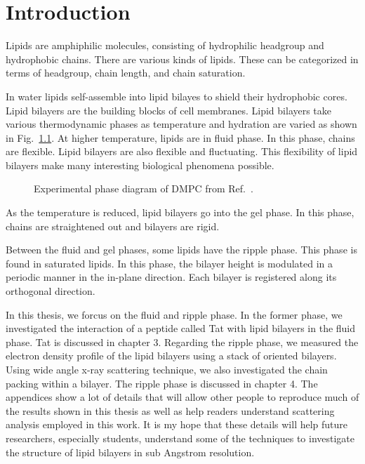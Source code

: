 \chapter{Introduction}
Lipids are amphiphilic molecules, consisting of hydrophilic headgroup
and hydrophobic chains. There are various kinds of lipids. These can be 
categorized in terms of headgroup, chain length, and chain saturation.

In water lipids self-assemble into lipid bilayes to shield their hydrophobic 
cores. Lipid bilayers are the building blocks of cell membranes. Lipid bilayers 
take various thermodynamic phases
as temperature and hydration are varied as shown in Fig.~\ref{fig:phase_diagram}.
At higher temperature, lipids are in fluid phase. In this phase, chains
are flexible. Lipid bilayers are also flexible and fluctuating. This
flexibility of lipid bilayers make many interesting biological
phenomena possible. 

\begin{figure}
  \centering
  \caption{Experimental phase diagram of DMPC from Ref.~\cite{ref:Janiak76}.}
  \label{fig:phase_diagram}
\end{figure}

As the temperature is reduced, lipid bilayers go into the gel phase.
In this phase, chains are straightened out and bilayers are rigid.

Between the fluid and gel phases, some lipids have the ripple phase.
This phase is found in saturated lipids. In this phase, the bilayer
height is modulated in a periodic manner in the in-plane direction.
Each bilayer is registered along its orthogonal direction.

In this thesis, we forcus on the fluid and ripple phase. In the former phase,
we investigated the interaction of a peptide called Tat with lipid bilayers
in the fluid phase. 
Tat is discussed in chapter 3.
Regarding the ripple phase, we measured the electron density profile of the lipid
bilayers using a stack of oriented bilayers. Using wide angle x-ray scattering
technique, we also investigated the chain packing within a bilayer. 
The ripple phase is discussed in chapter 4. 
The appendices show a lot of details that will
allow other people to reproduce much of the results shown in this thesis 
as well as help readers understand scattering analysis employed in this work.
It is my hope that these details will help future researchers,
especially students, understand some of the techniques to investigate the
structure of lipid bilayers in sub Angstrom resolution.